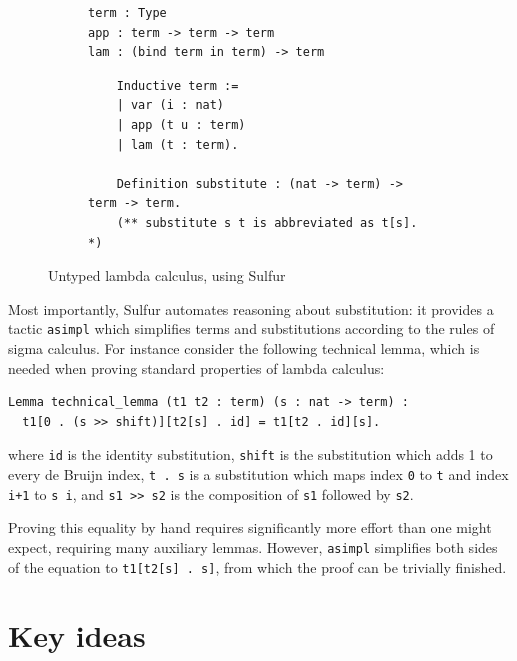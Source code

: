 \documentclass[sigplan,review,anonymous]{acmart}
\newcommand{\coq}[1]{\texttt{#1}}
\begin{document}
\begin{figure}[H]
  \centering
  \begin{subfigure}{0.4\textwidth}
\begin{verbatim}
term : Type
app : term -> term -> term
lam : (bind term in term) -> term
\end{verbatim}
    \label{fig:sulfur-example-a}
  \end{subfigure}

  \begin{subfigure}{0.4\textwidth}
  \begin{verbatim}
    Inductive term :=
    | var (i : nat)
    | app (t u : term)
    | lam (t : term).

    Definition substitute : (nat -> term) -> term -> term.
    (** substitute s t is abbreviated as t[s]. *)
    \end{verbatim}
    \label{fig:sulfur-example-b}
  \end{subfigure}

  \caption{Untyped lambda calculus, using Sulfur}
  \label{fig:sulfur-example}
\end{figure}

Most importantly, Sulfur automates reasoning about substitution:
it provides a tactic \coq{asimpl} which simplifies terms and substitutions
according to the rules of sigma calculus. For instance consider
the following technical lemma, which is needed when proving
standard properties of lambda calculus:

\begin{verbatim}
Lemma technical_lemma (t1 t2 : term) (s : nat -> term) :
  t1[0 . (s >> shift)][t2[s] . id] = t1[t2 . id][s].
\end{verbatim}
where \coq{id} is the identity substitution,
\coq{shift} is the substitution which adds 1 to every de
Bruijn index, \coq{t . s} is a substitution which maps index \coq{0} to \coq{t}
and index \coq{i+1} to \coq{s i}, and \coq{s1 >> s2} is the
composition of \coq{s1} followed by \coq{s2}.

Proving this equality by hand requires significantly more effort
than one might
expect, requiring many auxiliary lemmas. However,
\coq{asimpl} simplifies both sides of the equation to
\coq{t1[t2[s] . s]}, from which the proof can be trivially finished.

\section{Key ideas}
\end{document}

